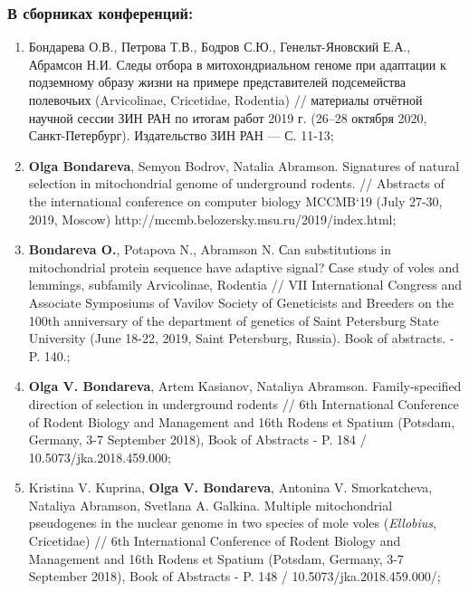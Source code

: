 \begin{small}
\subsubsection*{В сборниках конференций:}
\begin{enumerate}
	
\item[\textbullet] Бондарева О.В., Петрова Т.В., Бодров С.Ю., Генельт-Яновский Е.А., Абрамсон Н.И. Следы отбора в митохондриальном геноме при адаптации к подземному образу жизни на примере представителей подсемейства полевочьих (Arvicolinae, Cricetidae, Rodentia) // материалы отчётной научной сессии ЗИН РАН по итогам работ 2019 г. (26--28 октября 2020, Санкт-Петербург). Издательство ЗИН РАН --- С. 11-13;

\item[\textbullet] \textbf{Olga Bondareva}, Semyon Bodrov, Natalia Abramson. Signatures of natural selection in mitochondrial genome of underground rodents. // Abstracts of the international conference on computer biology MCCMB`19 (July 27-30, 2019, Moscow) http://mccmb.belozersky.msu.ru/2019/index.html;

\item[\textbullet] \textbf{Bondareva O.}, Potapova N., Abramson N. Сan substitutions in mitochondrial protein sequence have adaptive signal? Сase study of voles and lemmings, subfamily Arvicolinae, Rodentia // VII International Congress and Associate Symposiums of Vavilov Society of Geneticists and Breeders on the 100th anniversary of the department of genetics of Saint Petersburg State University (June 18-22, 2019, Saint Petersburg, Russia). Book of abstracts. - P. 140.;

\item[\textbullet] \textbf{Olga V. Bondareva}, Artem Kasianov, Nataliya Abramson. Family-specified direction of selection in underground rodents // 6th International Conference of Rodent Biology and Management and 16th Rodens et Spatium (Potsdam, Germany, 3-7 September 2018), Book of Abstracts - P. 184 / 10.5073/jka.2018.459.000;

\item[\textbullet] Kristina V. Kuprina, \textbf{Olga V. Bondareva}, Antonina V. Smorkatcheva, Nataliya Abramson, Svetlana A. Galkina. Multiple mitochondrial pseudogenes in the nuclear genome in two species of mole voles (\textit{Ellobius}, Cricetidae) // 6th International Conference of Rodent Biology and Management and 16th Rodens et Spatium (Potsdam, Germany, 3-7 September 2018), Book of Abstracts - P. 148 / 10.5073/jka.2018.459.000/;


\end{enumerate}
\end{small}

